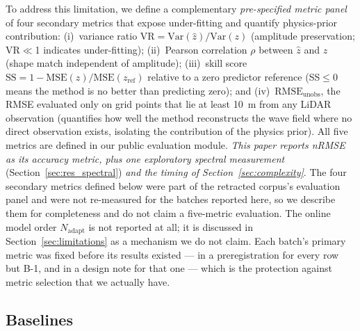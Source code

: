 \documentclass[review]{elsarticle}
\begin{document}
To address this limitation, we define a complementary
\emph{pre-specified metric panel} of four secondary metrics that
expose under-fitting and quantify physics-prior contribution:
(i)~variance ratio $\text{VR} = \text{Var}(\hat{z})/\text{Var}(z)$
(amplitude preservation; VR$\ll$1 indicates under-fitting);
(ii)~Pearson correlation $\rho$ between $\hat{z}$ and $z$
(shape match independent of amplitude);
(iii)~skill score $\text{SS} = 1 - \text{MSE}(\hat{z})/\text{MSE}(z_\text{ref})$
relative to a zero predictor reference
(SS$\leq 0$ means the method is no better than predicting zero);
and (iv)~$\text{RMSE}_{\text{unobs}}$, the RMSE evaluated only on grid
points that lie at least 10~m from any LiDAR observation
(quantifies how well the method reconstructs the wave field where
no direct observation exists, isolating the contribution of the
physics prior).
All five metrics are defined in our public evaluation module.
\emph{This paper reports nRMSE as its accuracy metric, plus one exploratory
spectral measurement} (Section~\ref{sec:res_spectral}) \emph{and the timing of
Section~\ref{sec:complexity}}. The four secondary metrics defined below were part of
the retracted corpus's evaluation panel and were not re-measured for the batches
reported here, so we describe them for completeness and do not claim a
five-metric evaluation. The online model order $N_\text{adapt}$ is not reported at
all; it is discussed in Section~\ref{sec:limitations} as a mechanism we do not claim.
Each batch's primary metric was fixed before its
results existed --- in a preregistration for every row but B-1, and in a design note
for that one --- which is the protection against metric selection that we actually
have.

\subsection{Baselines}
\end{document}
